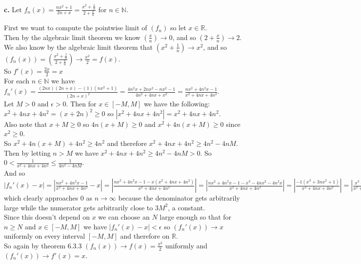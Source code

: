 \documentclass{article}
\begin{document}
{\Large\textbf{c.}} Let $f_n (x) =\frac{nx^2 + 1}{2n + x} =\frac{x^2 + \frac{1}{n}}{2 + \frac{x}{n}}$ for $n\in\mathbb{N}$.
\begin{center}
    \doublespacing
    First we want to compute the pointwise limit of $(f_n)$ so let $x\in\mathbb{R}$.
    \\Then by the algebraic limit theorem we know $(\frac{x}{n})\rightarrow 0$, and so $(2 +\frac{x}{n})\rightarrow 2$.
    \\We also know by the algebraic limit theorem that $(x^2 +\frac{1}{n})\rightarrow x^2$, and so $(f_n (x)) = (\frac{x^2 + \frac{1}{n}}{2 + \frac{x}{n}})\rightarrow\frac{x^2}{2} = f(x)$.
    \\So $f'(x) =\frac{2x}{2} = x$
    \\For each $n\in\mathbb{N}$ we have $f_n ' (x) =\frac{(2nx)(2n + x) - (1)(nx^2 + 1)}{(2n + x)^2} =\frac{4n^2 x + 2nx^2 - nx^2 - 1}{4n^2 + 4nx + x^2} =\frac{nx^2 + 4n^2 x - 1}{x^2 + 4nx + 4n^2}$.
    \\Let $M > 0$ and $\epsilon > 0$. Then for $x\in [-M, M]$ we have the following:
    \\$x^2 + 4nx + 4n^2 = (x + 2n)^2\geq 0$ so $|x^2 + 4nx + 4n^2| = x^2 + 4nx + 4n^2$.
    \\Also note that $x + M\geq 0$ so $4n(x + M)\geq 0$ and $x^2 + 4n(x + M)\geq 0$ since $x^2\geq 0$.
    \\So $x^2 + 4n(x + M) + 4n^2\geq 4n^2$ and therefore $x^2 + 4nx + 4n^2\geq 4n^2 - 4nM$. \\Then by letting $n > M$ we have $x^2 + 4nx + 4n^2\geq 4n^2 - 4nM > 0$. So $0 <\frac{1}{x^2 + 4nx + 4n^2}\leq\frac{1}{4n^2 - 4nM}$.
    \\And so $|f_n '(x) - x| = |\frac{nx^2 + 4n^2 x - 1}{x^2 + 4nx + 4n^2} - x| = |\frac{nx^2 + 4n^2 x - 1 - x(x^2 + 4nx + 4n^2)}{x^2 + 4nx + 4n^2}| = |\frac{nx^2 + 4n^2 x - 1 - x^3 - 4nx^2 - 4n^2 x}{x^2 + 4nx + 4n^2}| = |\frac{-1(x^3 + 3nx^2 + 1)}{x^2 + 4nx + 4n^2}| = |\frac{x^3 + 3nx^2 + 1}{x^2 + 4nx + 4n^2}|\leq |\frac{x^3}{x^2 + 4nx + 4n^2}| + |\frac{3nx^2}{x^2 + 4nx + 4n^2}| + |\frac{1}{x^2 + 4nx + 4n^2}| =\frac{|x|^3}{x^2 + 4nx + 4n^2} + \frac{3n|x|^2}{x^2 + 4nx + 4n^2} + \frac{1}{x^2 + 4nx + 4n^2}\leq\frac{M^3}{x^2 + 4nx + 4n^2} + \frac{3nM^2}{x^2 + 4nx + 4n^2} + \frac{1}{x^2 + 4nx + 4n^2} =\frac{M^3 + 3nM^2 + 1}{x^2 + 4nx + 4n^2}\leq\frac{M^3 + 3nM^2 + 1}{4n^2 - 4nM} =\frac{\frac{M^3}{n} + 3M^2 +\frac{1}{n}}{4n - 4M}$ which clearly approaches 0 as $n\rightarrow\infty$ because the denominator gets arbitrarily large while the numerator gets arbitrarily close to $3M^2$, a constant.
    \\Since this doesn't depend on $x$ we can choose an $N$ large enough so that for $n\geq N$ and $x\in [-M, M]$ we have $|f_n '(x) - x| <\epsilon$ so $(f_n '(x))\rightarrow x$ uniformly on every interval $[-M, M]$ and therefore on $\mathbb{R}$.
    \\So again by theorem 6.3.3 $(f_n (x))\rightarrow f(x) =\frac{x^2}{2}$ uniformly and $(f_n '(x))\rightarrow f'(x) = x$.
\end{center}
\end{document}
